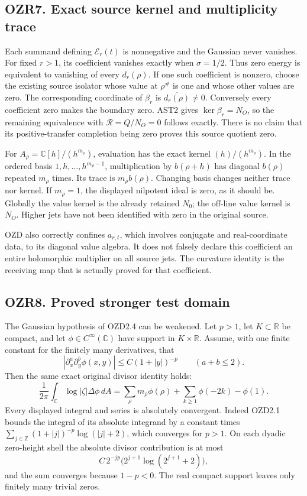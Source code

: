 \subsection{OZR7. Exact source kernel and multiplicity
trace}\label{ozr7.-exact-source-kernel-and-multiplicity-trace}

Each summand defining \(\mathcal E_r(t)\) is nonnegative and the
Gaussian never vanishes. For fixed \(r>1\), its coefficient vanishes
exactly when \(\sigma=1/2\). Thus zero energy is equivalent to vanishing
of every \(d_r(\rho)\). If one such coefficient is nonzero, choose the
existing source isolator whose value at \(\rho^\#\) is one and whose
other values are zero. The corresponding coordinate of \(\beta_r\) is
\(\overline{d_r(\rho)}\ne0\). Conversely every coefficient zero makes
the boundary zero. AST2 gives \(\ker\beta_r=N_O\), so the remaining
equivalence with \(\mathcal R=Q/N_O=0\) follows exactly. There is no
claim that its positive-transfer completion being zero proves this
source quotient zero.

For \(A_\rho=\mathbb C[h]/(h^{m_\rho})\), evaluation has the exact
kernel \((h)/(h^{m_\rho})\). In the ordered basis
\(1,h,\ldots,h^{m_\rho-1}\), multiplication by \(b(\rho+h)\) has
diagonal \(b(\rho)\) repeated \(m_\rho\) times. Its trace is
\(m_\rho b(\rho)\). Changing basis changes neither trace nor kernel. If
\(m_\rho=1\), the displayed nilpotent ideal is zero, as it should be.
Globally the value kernel is the already retained \(N_0\); the off-line
value kernel is \(N_O\). Higher jets have not been identified with zero
in the original source.

OZD also correctly confines \(a_{r,t}\), which involves conjugate and
real-coordinate data, to its diagonal value algebra. It does not falsely
declare this coefficient an entire holomorphic multiplier on all source
jets. The curvature identity is the receiving map that is actually
proved for that coefficient.

\subsection{OZR8. Proved stronger test
domain}\label{ozr8.-proved-stronger-test-domain}

The Gaussian hypothesis of OZD2.4 can be weakened. Let \(p>1\), let
\(K\subset\mathbb R\) be compact, and let
\(\phi\in C^\infty(\mathbb C)\) have support in \(K\times\mathbb R\).
Assume, with one finite constant for the finitely many derivatives, that
\[
|\partial_x^a\partial_y^b\phi(x,y)|
\le C(1+|y|)^{-p}\qquad(a+b\le2).
\tag{OZR8.1}
\] Then the same exact original divisor identity holds: \[
\frac1{2\pi}\int_{\mathbb C}\log|\zeta|\Delta\phi\,dA
=\sum_\rho m_\rho\phi(\rho)+\sum_{k\ge1}\phi(-2k)-\phi(1).
\tag{OZR8.2}
\] Every displayed integral and series is absolutely convergent. Indeed
OZD2.1 bounds the integral of its absolute integrand by a constant times
\(\sum_{j\in\mathbb Z}(1+|j|)^{-p}\log(|j|+2)\), which converges for
\(p>1\). On each dyadic zero-height shell the absolute divisor
contribution is at most \[
C\,2^{-jp}\bigl(2^{j+1}\log(2^{j+1}+2)\bigr),
\] and the sum converges because \(1-p<0\). The real compact support
leaves only finitely many trivial zeros.

